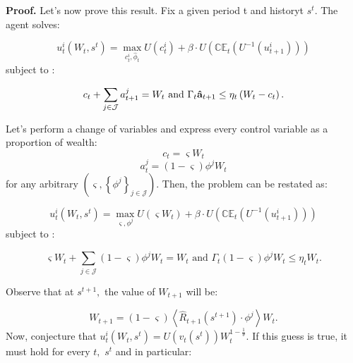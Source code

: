 \documentclass{article}
\begin{document}
\textbf{Proof.} Let's now prove this result. Fix a given period t and
historyt $s^{t}$. The agent solves:

\begin{equation*}
u_{t}^{i}\left( W_{t},s^{t}\right) =\max_{c_{t}^{i},\hat{\phi}_{t}}U\left(
c_{t}^{i}\right) +\beta \cdot U\left( \mathbb{CE}_{t}\left( U^{-1}\left(
u_{t+1}^{i}\right) \right) \right)
\end{equation*}%
subject to :

\begin{equation*}
c_{t}+\sum_{j\in \mathcal{J}}a_{t+1}^{j}=W_{t}\text{ and }\Gamma _{t}\mathbf{%
\hat{a}}_{t+1}\leq \eta _{t}\left( W_{t}-c_{t}\right) .
\end{equation*}

Let's perform a change of variables and express every control variable as a
proportion of wealth:%
\begin{equation*}
c_{t}=\varsigma W_{t}
\end{equation*}%
\begin{equation*}
a_{t}^{j}=\left( 1-\varsigma \right) \phi ^{j}W_{t}
\end{equation*}%
for any arbitrary $\left( \varsigma ,\left\{ \phi ^{j}\right\} _{j\in
\mathcal{J}}\right) .$ Then, the problem can be restated as:

\begin{equation*}
u_{t}^{i}\left( W_{t},s^{t}\right) =\max_{\varsigma ,\phi ^{j}}U\left(
\varsigma W_{t}\right) +\beta \cdot U\left( \mathbb{CE}_{t}\left(
U^{-1}\left( u_{t+1}^{i}\right) \right) \right)
\end{equation*}%
subject to :

\begin{equation*}
\varsigma W_{t}+\sum_{j\in \mathcal{J}}\left( 1-\varsigma \right) \phi
^{j}W_{t}=W_{t}\text{ and }\Gamma _{t}\left( 1-\varsigma \right) \phi
^{j}W_{t}\leq \eta _{t}W_{t}.
\end{equation*}

Observe that at $s^{t+1},$ the value of $W_{t+1}$ will be:

\begin{equation*}
W_{t+1}=\left( 1-\varsigma \right) \left\langle \hat{R}_{t+1}\left(
s^{t+1}\right) \cdot \phi ^{j}\right\rangle W_{t}.
\end{equation*}%
Now, conjecture that $u_{t}^{i}\left( W_{t},s^{t}\right) =U\left(
v_{t}\left( s^{t}\right) \right) W_{t}^{1-\frac{1}{\theta }}.$ If this guess
is true, it must hold for every $t,$ $s^{t}$ and in particular:
\end{document}
